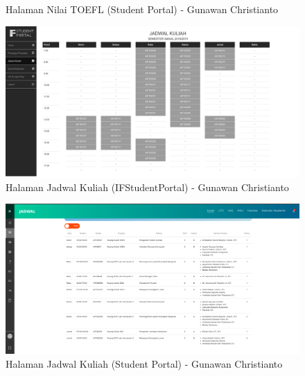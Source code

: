 \begin{itemize}
\begin{enumerate}
\begin{figure}[H]
			\caption{Halaman Nilai TOEFL (Student Portal) - Gunawan Christianto}
			\label{fig:2016_1_toefl_studentportal}
		\end{figure}
		\begin{figure}[H]
			\centering
			\includegraphics[scale=0.25]{Gambar/HasilPengujian/2016_1_jadwal_kuliah_ifstudentportal}
			\caption{Halaman Jadwal Kuliah (IFStudentPortal) - Gunawan Christianto}
			\label{fig:2016_1_jadwal_kuliah_ifstudentportal}
		\end{figure}
		\begin{figure}[H]
			\centering
			\includegraphics[scale=0.25]{Gambar/HasilPengujian/2016_1_jadwal_kuliah_studentportal}
			\caption{Halaman Jadwal Kuliah (Student Portal) - Gunawan Christianto}
			\label{fig:2016_1_jadwal_kuliah_studentportal}
		\end{figure}

\end{enumerate}
\end{itemize}
